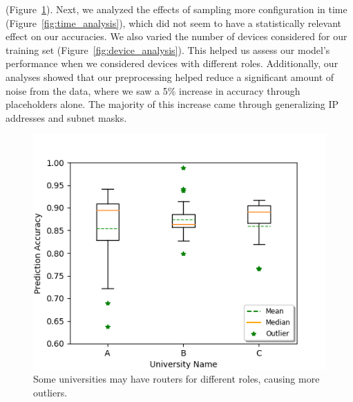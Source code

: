 (Figure~\ref{fig:uni_analysis}). Next, we analyzed the effects of sampling more configuration in time (Figure~\ref{fig:time_analysis}), which did not seem to have a statistically relevant effect on our accuracies. We also varied the number of devices considered for our training set (Figure~\ref{fig:device_analysis}). This helped us assess our model's performance when we considered devices with different roles. Additionally, our analyses showed that our preprocessing helped reduce a significant amount of noise from the data, where we saw a 5\% increase in accuracy through placeholders alone. The majority of this increase came through generalizing IP addresses and subnet masks.\\

\begin{figure}
	\centering
	\includegraphics[width=\columnwidth]{uni_analysis.png}
	\caption{Some universities may have routers for different roles, causing more outliers.}
    \label{fig:uni_analysis}
\end{figure}

